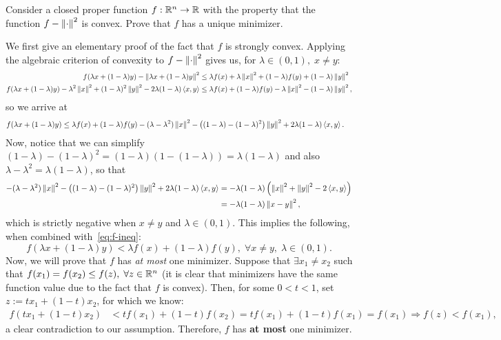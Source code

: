 \documentclass[10pt]{article}
\begin{document}
\allowdisplaybreaks
\everymath{\displaystyle}
\newenvironment{longlisting}{\captionsetup{type=listing}}{}


\begin{Exercise}
	Consider a closed proper function $f: \mathbb{R}^n \to \mathbb{R}$ with the property
	that the function $f - \left \| \cdot \right \|^2$ is convex. Prove that $f$ has a
	unique minimizer.
\end{Exercise}
\begin{Answer}
	We first give an elementary proof of the fact that $f$ is strongly convex.
	Applying the algebraic criterion of convexity to $f - \left \| \cdot \right \|^2$ gives
	us, for $\lambda \in (0, 1), \; x \neq y$:
	\begin{align*}
		f(\lambda x + (1 - \lambda) y) - \left \| \lambda x + (1 - \lambda) y \right \|^2
		&\leq \lambda f(x) + \lambda \left \| x \right \|^2 + (1 - \lambda) f(y) + (1 -
		\lambda) \left \| y \right \|^2 \nonumber \\
		f(\lambda x + (1 - \lambda) y) - \lambda^2 \left \| x \right \|^2 + (1 - \lambda)^2
		\left \| y \right \|^2 - 2 \lambda(1 - \lambda) \left\langle x, y \right\rangle &\leq
			\lambda f(x) + (1 - \lambda) f(y) - \lambda \left \| x \right \|^2 - (1 -
			\lambda) \left \| y \right \|^2,
	\end{align*}
	so we arrive at
	\begin{align}
		f(\lambda x + (1 - \lambda) y) &\leq
		\lambda f(x) + (1 - \lambda) f(y) - (\lambda - \lambda^2) \left \| x \right \|^2
		- \left( (1 - \lambda) - (1 - \lambda)^2 \right) \left \| y \right \|^2
		+ 2 \lambda (1 - \lambda) \left\langle x, y \right\rangle.
		\label{eq:f-ineq}
	\end{align}
	Now, notice that we can simplify $(1 - \lambda) - (1 - \lambda)^2 =
	(1 - \lambda)( 1 - (1 - \lambda)) = \lambda(1 - \lambda)$ and also $\lambda
	- \lambda^2 = \lambda(1 - \lambda)$, so that
	\begin{align*}
		-(\lambda - \lambda^2) \left \| x \right \|^2 - \left( (1 - \lambda) - (1 -
		\lambda)^2 \right) \left \| y \right \|^2 + 2 \lambda(1 - \lambda) \left\langle x, y \right\rangle &=
		-\lambda (1 - \lambda) \left(\left \| x \right \|^2 + \left \| y \right \|^2 - 2 \left\langle x,
		y \right\rangle\right) \\
			&= -\lambda(1 - \lambda) \left \| x - y \right \|^2,
	\end{align*}
	which is strictly negative when $x \neq y$ and $\lambda \in (0, 1)$. This
	implies the following, when combined with~\cref{eq:f-ineq}:
	\[
		f(\lambda x + (1 - \lambda) y) < \lambda f(x) +
		(1 - \lambda) f(y), \; \forall x \neq y, \; \lambda \in (0, 1).
	\]
	Now, we will prove that $f$ has \textit{at most} one minimizer. Suppose
	that $\exists x_1 \neq x_2$ such that $f(x_1) = f(x_2) \leq f(z), \;
	\forall z \in \mathbb{R}^n$ (it is clear that minimizers have the same function
	value due to the fact that $f$ is convex).
	Then, for some $0 < t < 1$, set $z := t x_1 + (1 - t) x_2$, for which we
	know:
	\begin{align*}
		f(t x_1 + (1 - t) x_2) & < t f(x_1) + (1 - t) f(x_2) = t f(x_1) + (1 - t)
		f(x_1) = f(x_1) \Rightarrow f(z) < f(x_1),
	\end{align*}
	a clear contradiction to our assumption. Therefore, $f$ has \textbf{at
	most} one minimizer.


\end{Answer}
\end{document}
